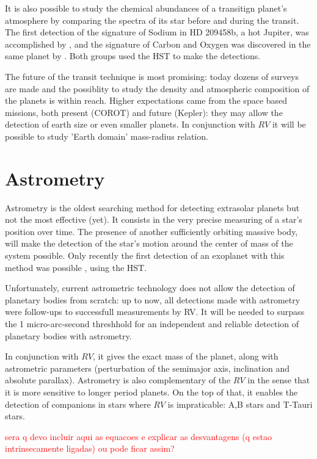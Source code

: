 \documentclass[dvips,12pt,a4paper]{report}
\begin{document}
It is also possible to study the chemical abundances of a transitign planet's atmosphere by comparing the spectra of its star before and during the transit. The first detection of the signature of Sodium in HD 209458b, a hot Jupiter, was accomplished by \citet{Charbonneau-2002}, and the signature of Carbon and Oxygen was discovered in the same planet by \citet{Vidal-Madjar-2004}. Both groups used the HST to make the detections.

The future of the transit technique is most promising: today dozens of surveys are made and the possiblity to study the density and atmospheric composition of the planets is within reach. Higher expectations came from the space based missions, both present (COROT) and future (Kepler): they may allow the detection of earth size or even smaller planets. In conjunction with $RV$ it will be possible to study 'Earth domain' mass-radius relation.

\section{Astrometry}
\label{astrometry}
Astrometry is the oldest searching method for detecting extrasolar planets but not the most effective (yet). It consists in the very precise measuring of a star's position over time. The presence of another sufficiently orbiting massive body, will make the detection of the star's motion around the center of mass of the system possible. Only recently the first detection of an exoplanet with this method was possible \citep{Benedict-2002}, using the HST. 

Unfortunately, current astrometric technology does not allow the detection of planetary bodies from scratch: up to now, all detections made with astrometry were follow-ups to successfull measurements by RV. It will be needed to surpass the 1 micro-arc-second threshhold for an independent and reliable detection of planetary bodies with astrometry.

In conjunction with $RV$, it gives the exact mass of the planet, along with astrometric parameters (perturbation of the semimajor axis, inclination and absolute parallax). Astrometry is also complementary of the $RV$ in the sense that it is more sensitive to longer period planets. On the top of that, it enables the detection of companions in stars where $RV$ is impraticable: A,B stars and T-Tauri stars.

\textcolor{red}{sera q devo incluir aqui as equacoes e explicar as desvantagens (q estao intrinsecamente ligadas) ou pode ficar assim?}
\end{document}
